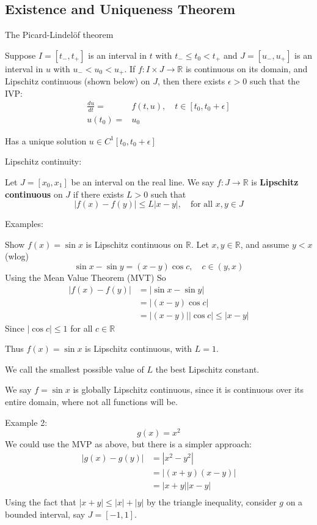 \documentclass{/home/janmebows/Documents/LatexTemplates/myassignment}
\begin{document}
\subsection{Existence and Uniqueness Theorem}
The Picard-Lindel\"of theorem 

Suppose $I = [t_-,t_+]$ is an interval in $t$ with $t_- \leq t_0 < t_+$ and $J=[u_-,u_+]$ is an interval in $u$ with $u_-<u_0<u_+$. If $f : I\times J \to \mathbb{R}$ is continuous on its domain, and Lipschitz continuous (shown below) on $J$, then there exists $\epsilon >0$ such that the IVP:
\begin{align*}
    \frac{du}{dt} =& f(t,u),\quad t\in [t_0,t_0+\epsilon]\\
    u(t_0) =& u_0
\end{align*}

Has a unique solution $u \in C^1 [t_0,t_0+\epsilon]$

Lipschitz continuity:

Let $J=[x_0,x_1]$ be an interval on the real line. We say $f: J\to \mathbb{R}$ is  \textbf{Lipschitz continuous} on $J$ if there exists $L>0$ such that
\[|f(x) - f(y)| \leq L|x-y|,\quad \text{for all } x,y\in J\]

Examples:

Show $f(x) = \sin x$ is Lipschitz continuous on $\mathbb{R}$. Let $x,y \in \mathbb{R}$, and assume $y < x$ (wlog)
\[\sin x - \sin y = (x - y)\cos c,\quad c \in (y,x)\]
Using the Mean Value Theorem (MVT)
So
\begin{align*}
    |f(x) - f(y)| &= |\sin x - \sin y|\\
    &=|(x - y)\cos c|\\
    &=|(x-y)||\cos c| \leq |x-y|
\end{align*}
Since $|\cos c| \leq 1 $ for all $c \in \mathbb{R}$

Thus $f(x) = \sin x$ is Lipschitz continuous, with $L=1$. 

We call the smallest possible value of $L$ the best Lipschitz constant.

We say $f=\sin x$ is globally Lipschitz continuous, since it is continuous over its entire domain, where not all functions will be.


Example 2:
\[g(x) = x^2\]
We could use the MVP as above, but there is a simpler approach:
\begin{align*}
    |g(x) - g(y)| &= |x^2 - y^2|\\
    &= |(x+y)(x-y)|\\
    &= |x+y||x-y|\\
\end{align*}
Using the fact that $|x+y| \leq |x|+|y|$ by the triangle inequality, consider $g$ on a bounded interval, say $J = [-1,1]$.
\end{document}
